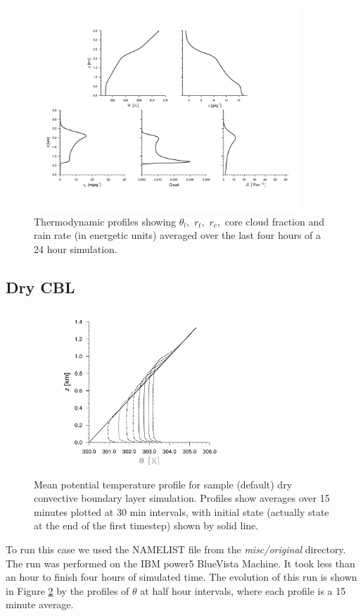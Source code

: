 \documentclass[11pt,a4paper]{article}
\begin{document}
\begin{figure}
\centering \leavevmode 
\includegraphics[width=10cm]{rico}
\caption{Thermodynamic profiles showing $\theta_l,$ $r_t,$ $r_c,$ core
cloud fraction and rain rate (in energetic units) averaged over the
last four hours of a 24 hour simulation.}
\label{fig:rico}
\end{figure}

\subsection{Dry CBL}

\begin{figure}
\centering \leavevmode 
\includegraphics[width=8cm]{cbl}
\caption{Mean potential temperature profile for sample (default) dry
convective boundary layer simulation.  Profiles show averages over
15 minutes plotted at 30 min intervals, with initial state 
(actually state at the end of the first timestep) shown by solid line.}
\label{fig:cbl}
\end{figure}

To run this case we used the NAMELIST
file from the \emph{misc/original} directory. The run was
performed on the IBM power5 BlueVista Machine. It took
less than an hour to finish four hours of simulated time.
The evolution of this run is shown in Figure \ref{fig:cbl} by the
profiles of $\theta$ at half hour intervals, where each profile is a
15 minute average.
\end{document}
